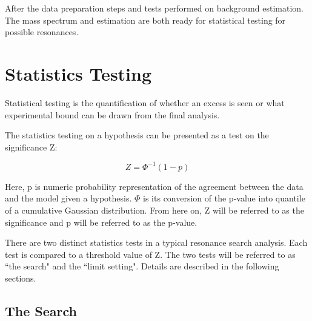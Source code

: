 After the data preparation steps and tests performed on background estimation. The mass spectrum and estimation are both ready for statistical testing for possible resonances. 

\section{Statistics Testing}
\label{section:stats}
Statistical testing is the quantification of whether an excess is seen or what experimental bound can be drawn from the final analysis. 

The statistics testing on a hypothesis can be presented as a test on the significance Z: 

\begin{equation}
 Z= \Phi^{-1}(1-p) 
 \label{eq:significance}
\end{equation}

Here, p is numeric probability representation of the agreement between the data and the model given a hypothesis. $\Phi$ is its conversion of the p-value into quantile of a cumulative Gaussian distribution. From here on, Z will be referred to as the significance and p will be referred to as the p-value.

There are two distinct statistics tests in a typical resonance search analysis. Each test is compared to a threshold value of Z. The two tests will be referred to as ``the search" and the ``limit setting". Details are described in the following sections.





\subsection{The Search}
\label{sec:thesearch}

